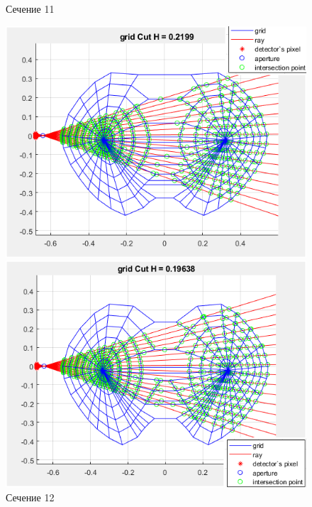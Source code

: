 \documentclass[a4]{article}
\begin{document}
\begin{figure}[H]
\begin{center}
\caption{Сечение 11}
\includegraphics{pic16.png} 

\caption{Сечение 12}
\includegraphics{pic17.png} 
\end{center}
\end{figure}
\end{document}
